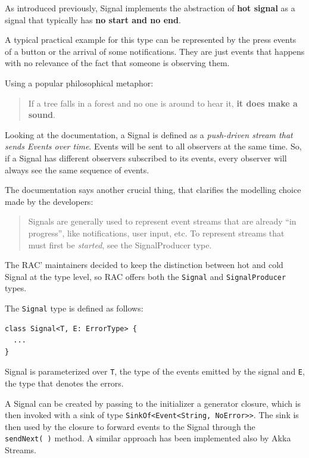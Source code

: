 As introduced previously, Signal implements the abstraction of
\textbf{hot signal} as a signal that typically has \textbf{no start and
no end}.

A typical practical example for this type can be represented by the press
events of a button or the arrival of some notifications. They are just
events that happens with no relevance of the fact that someone is
observing them.

Using a popular philosophical metaphor:

\begin{quote}
If a tree falls in a forest and no one is around to hear it, \textbf{it
does make a sound}.
\end{quote}

Looking at the documentation, a Signal is defined as a \emph{push-driven
stream that sends Events over time}. Events will be sent to all
observers at the same time. So, if a Signal has different observers
subscribed to its events, every observer will always see the same
sequence of events.

The documentation says another crucial thing, that clarifies the
modelling choice made by the developers:

\begin{quote}
Signals are generally used to represent event streams that are already
``in progress'', like notifications, user input, etc. To represent
streams that must first be \emph{started}, see the SignalProducer type.
\end{quote}

The RAC' maintainers decided to keep the distinction between hot and cold
Signal at the type level, so RAC offers both the \texttt{Signal} and
\texttt{SignalProducer} types.

The \texttt{Signal} type is defined as follows:

\begin{verbatim}
class Signal<T, E: ErrorType> {
  ...
}
\end{verbatim}

Signal is parameterized over \texttt{T}, the type of the events emitted
by the signal and \texttt{E}, the type that denotes the errors.

A Signal can be created by passing to the initializer a generator
closure, which is then invoked with a sink of type
\texttt{SinkOf\textless{}Event\textless{}String,\ NoError\textgreater{}\textgreater{}}.
The sink is then used by the closure to forward events to the Signal
through the \texttt{sendNext(\ )} method. A similar approach has been
implemented also by Akka Streams.

